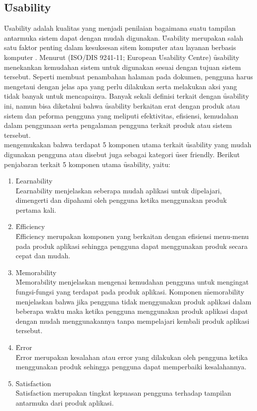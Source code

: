 \subsection{\f{Usability}}\label{subsec:usability}
\f{Usability} adalah kualitas yang menjadi penilaian bagaimana suatu tampilan antarmuka sistem dapat dengan mudah digunakan. \f{Usability} merupakan salah satu faktor penting dalam kesuksesan sitem komputer atau layanan berbasis komputer \citep{paper.smith}. Menurut (ISO/DIS 9241-11; European Usability Centre) \f{usability} menekankan kemudahan sistem untuk digunakan sesuai dengan tujuan sistem tersebut. Seperti membuat penambahan halaman pada dokumen, pengguna harus mengetaui dengan jelas apa yang perlu dilakukan serta melakukan aksi yang tidak banyak untuk mencapainya.
Banyak sekali definisi terkait dengan \f{usability} ini, namun bisa diketahui bahwa \f{usability} berkaitan erat dengan produk atau sistem dan peforma pengguna yang meliputi efektivitas, efisiensi, kemudahan dalam penggunaan serta pengalaman pengguna terkait produk atau sistem tersebut.
\newline\\
\citet{article.5ux} mengemukakan bahwa terdapat 5 komponen utama terkait \f{usability} yang mudah digunakan pengguna atau disebut juga sebagai kategori \f{user friendly}. Berikut penjabaran terkait 5 komponen utama \f{usability}, yaitu:
\pagebreak
\begin{enumerate}
	\item \f{Learnability}\\
	\f{Learnability} menjelaskan seberapa mudah aplikasi untuk dipelajari, dimengerti dan dipahami oleh pengguna ketika menggunakan produk pertama kali.
	\item \f{Efficiency}\\
	\f{Efficiency} merupakan komponen yang berkaitan dengan efisiensi menu-menu pada produk aplikasi sehingga pengguna dapat menggunakan produk secara cepat dan mudah.
	\item \f{Memorability}\\
	\f{Memorability} menjelaskan mengenai kemudahan pengguna untuk mengingat fungsi-fungsi yang terdapat pada produk aplikasi. Komponen \f{memorability} menjelaskan bahwa jika pengguna tidak menggunakan produk aplikasi dalam beberapa waktu maka ketika pengguna menggunakan produk aplikasi dapat dengan mudah menggunakannya tanpa mempelajari kembali produk aplikasi tersebut.
	\item \f{Error}\\
	\f{Error} merupakan kesalahan atau error yang dilakukan oleh pengguna ketika menggunakan produk sehingga pengguna dapat memperbaiki kesalahannya.
	\item \f{Satisfaction}\\
	\f{Satisfaction} merupakan tingkat kepuasan pengguna terhadap tampilan antarmuka dari produk aplikasi.
\end{enumerate}
